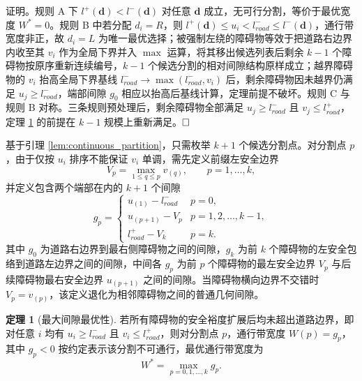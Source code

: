 \documentclass[a4paper,11pt]{ctexart}
\theoremstyle{definition}
\newtheorem{theorem}{定理}[section]
\begin{document}
证明。规则 A 下 $l^{+}(\mathbf{d}) < l^{-}(\mathbf{d})$ 对任意 $\mathbf{d}$ 成立，无可行分割，等价于最优宽度 $W^{*}=0$。规则 B 中若分配 $d_i = R$，则 $l^{+}(\mathbf{d}) \leq u_i < l_{road}^{-} \leq l^{-}(\mathbf{d})$，通行带宽度非正，故 $d_i = L$ 为唯一最优选择；被强制左绕的障碍物等效于把道路右边界内收至其 $v_i$ 作为全局下界并入 $\max$ 运算，将其移出候选列表后剩余 $k-1$ 个障碍物按原序重新连续编号，$k-1$ 个候选分割的相对间隙结构原样成立；越界障碍物的 $v_i$ 抬高全局下界基线 $l_{road}^{-}\to\max(l_{road}^{-},v_i)$ 后，剩余障碍物因未越界仍满足 $u_j\geq l_{road}^{-}$，端部间隙 $g_0$ 相应以抬高后基线计算，定理前提不破坏。规则 C 与规则 B 对称。三条规则预处理后，剩余障碍物全部满足 $u_j \geq l_{road}^{-}$ 且 $v_j \leq l_{road}^{+}$，定理 \ref{thm:max_gap} 的前提在 $k-1$ 规模上重新满足。$\hfill\Box$

基于引理 \ref{lem:continuous_partition}，只需枚举 $k+1$ 个候选分割点。对分割点 $p$，由于仅按 $u_i$ 排序不能保证 $v_i$ 单调，需先定义前缀左安全边界
\begin{equation}
    V_p = \max_{1 \leq q \leq p} v_{(q)}, \qquad p = 1, \ldots, k,
    \label{eq:prefix_v}
\end{equation}
并定义包含两个端部在内的 $k+1$ 个间隙
\begin{equation}
    g_p = \begin{cases}
        u_{(1)} - l_{road}^{-} & p = 0, \\[0.3em]
        u_{(p+1)} - V_p & p = 1, 2, \ldots, k-1, \\[0.3em]
        l_{road}^{+} - V_k & p = k.
    \end{cases}
    \label{eq:gap_def}
\end{equation}
其中 $g_0$ 为道路右边界到最右侧障碍物之间的间隙，$g_k$ 为前 $k$ 个障碍物的左安全包络到道路左边界之间的间隙，中间各 $g_p$ 为前 $p$ 个障碍物的最左安全边界 $V_p$ 与后续障碍物最右安全边界 $u_{(p+1)}$ 之间的间隙。当障碍物横向边界不交错时 $V_p = v_{(p)}$，该定义退化为相邻障碍物之间的普通几何间隙。

\begin{theorem}[最大间隙最优性]
\label{thm:max_gap}
若所有障碍物的安全裕度扩展后均未超出道路边界，即对任意 $i$ 均有 $u_i \geq l_{road}^{-}$ 且 $v_i \leq l_{road}^{+}$，则对分割点 $p$，通行带宽度 $W(p) = g_p$，其中 $g_p < 0$ 按约定表示该分割不可通行，最优通行带宽度为
\begin{equation}
    W^{*} = \max_{p = 0, 1, \ldots, k} g_p.
    \label{eq:max_gap_opt}
\end{equation}
\end{theorem}
\end{document}
